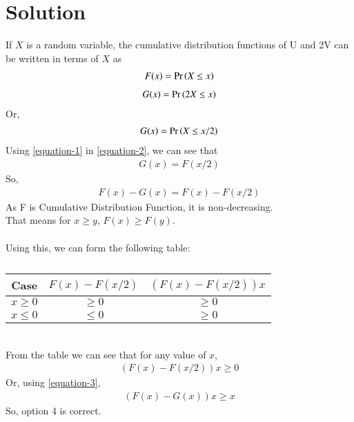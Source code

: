 \documentclass[journal,12pt,twocolumn]{IEEEtran}
\begin{document}
\section{Solution}
If $X$ is a random variable, the cumulative distribution functions of U and 2V can be written in terms of $X$ as
\begin{align} \label{equation-1}
    F(x)=\Pr\left(X \leq x\right) 
\end{align}
\begin{align}
    G(x)=\Pr\left(2X \leq x\right)
\end{align}
Or,
\begin{align} \label{equation-2}
     G(x)=\Pr\left(X \leq x/2\right)
\end{align}
Using \ref{equation-1} in \ref{equation-2}, we can see that
\begin{align} \label{equation-3}
    G(x)=F(x/2)
\end{align}
So,
\begin{align}
    F(x)-G(x)=F(x)-F(x/2)
\end{align}
As F is Cumulative Distribution Function, it is non-decreasing.\\
That means for $x \geq y$, $F(x) \geq F(y)$.\\ \\
Using this, we can form the following table:
\begin{table}[h!]
    \centering
    \begin{tabular}{|c|c|c|}
        \hline
        Case & $F(x)-F(x/2)$ & $(F(x)-F(x/2))x$ \\
        \hline
        $x \geq 0$ & $\geq 0$ & $\geq 0$ \\
        \hline
        $x \leq 0$ & $\leq 0$ & $\geq 0$ \\
        \hline
    \end{tabular}
    \caption{}
    \label{table-1}
\end{table}\\
From the table we can see that for any value of $x$,
\begin{align}
    (F(x)-F(x/2))x \geq 0
\end{align}
Or, using \ref{equation-3},
\begin{align}
    (F(x)-G(x))x \geq x
\end{align}
So, option 4 is correct.
\end{document}
